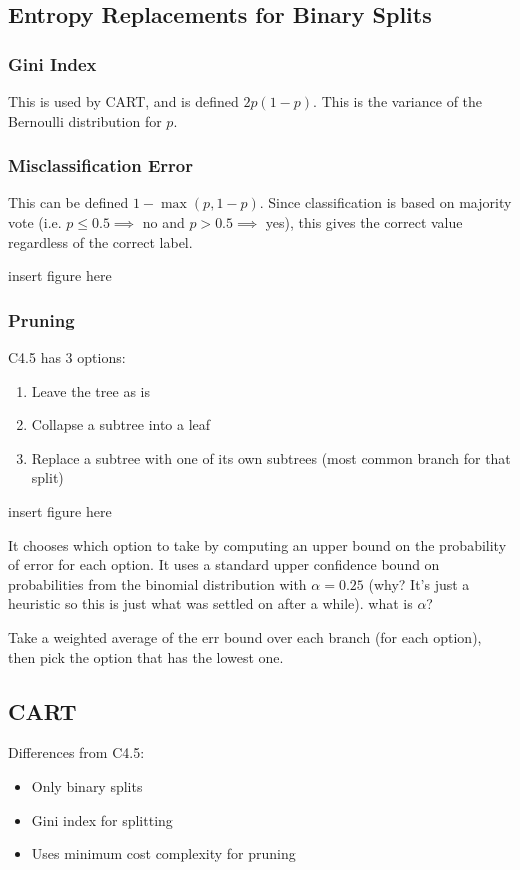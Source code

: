 \documentclass{article}
\begin{document}
\subsection{Entropy Replacements for Binary Splits}
\subsubsection{Gini Index}
This is used by CART, and is defined $2p(1-p)$. This is the variance of the Bernoulli distribution for $p$.

\subsubsection{Misclassification Error}
This can be defined $1-\max(p,1-p)$. Since classification is based on majority vote (i.e. $p\leq 0.5 \implies$ no and $p> 0.5 \implies $ yes), this gives the correct value regardless of the correct label.

{\color{red}insert figure here} 


\subsubsection{Pruning}
C4.5 has 3 options:
\begin{enumerate}
	\item Leave the tree as is
	\item Collapse a subtree into a leaf
	\item Replace a subtree with one of its own subtrees (most common branch for that split)
\end{enumerate}

{\color{red}insert figure here} 

It chooses which option to take by computing an upper bound on the probability of error for each option. It uses a standard upper confidence bound on probabilities from the binomial distribution with $\alpha=0.25$ (why? It's just a heuristic so this is just what was settled on after a while).
{\color{red}what is $\alpha$?} 

Take a weighted average of the err bound over each branch (for each option), then pick the option that has the lowest one.


\subsection{CART}
Differences from C4.5:
\begin{itemize}
	\item Only binary splits
	\item Gini index for splitting
	\item Uses minimum cost complexity for pruning
\end{itemize}
\end{document}
